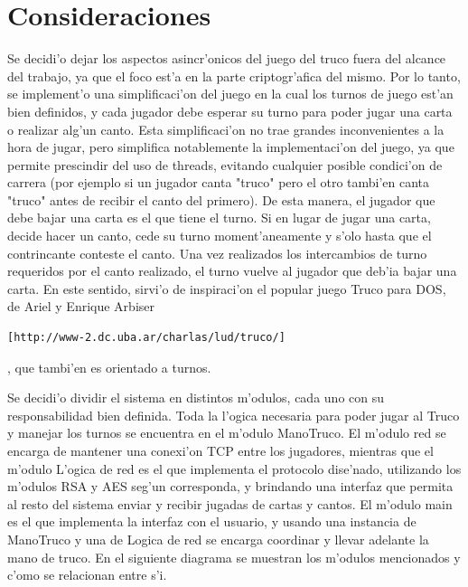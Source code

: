 \section{Consideraciones}
Se decidi'o dejar los aspectos asincr'onicos del juego del truco fuera del alcance del trabajo, ya que el foco est'a en la parte criptogr'afica del mismo.
Por lo tanto, se implement'o una simplificaci'on del juego en la cual los turnos de juego est'an bien definidos, y cada jugador debe esperar su turno para poder jugar una carta o realizar alg'un canto. Esta simplificaci'on no trae grandes inconvenientes a la hora de jugar, pero simplifica notablemente la implementaci'on del juego, ya que permite prescindir del uso de threads, evitando cualquier posible condici'on de carrera (por ejemplo si un jugador canta "truco" pero el otro tambi'en canta "truco" antes de recibir el canto del primero).
De esta manera, el jugador que debe bajar una carta es el que tiene el turno. Si en lugar de jugar una carta, decide hacer un canto, cede su turno moment'aneamente y s'olo hasta que el contrincante conteste el canto. Una vez realizados los intercambios de turno requeridos por el canto realizado, el turno vuelve al jugador que deb'ia bajar una carta.
En este sentido, sirvi'o de inspiraci'on el popular juego Truco para DOS, de Ariel y Enrique Arbiser \begin{verbatim}[http://www-2.dc.uba.ar/charlas/lud/truco/]\end{verbatim}, que tambi'en es orientado a turnos.


Se decidi'o dividir el sistema en distintos m'odulos, cada uno con su responsabilidad bien definida. Toda la l'ogica necesaria para poder jugar al Truco y manejar los turnos se encuentra en el m'odulo ManoTruco. El m'odulo red se encarga de mantener una conexi'on TCP entre los jugadores, mientras que el m'odulo L'ogica de red es el que implementa el protocolo dise'nado, utilizando los m'odulos RSA y AES seg'un corresponda, y brindando una interfaz que permita al resto del sistema enviar y recibir jugadas de cartas y cantos. El m'odulo main es el que implementa la interfaz con el usuario, y usando una instancia de ManoTruco y una de Logica de red se encarga coordinar y llevar adelante la mano de truco.
En el siguiente diagrama se muestran los m'odulos mencionados y c'omo se relacionan entre s'i.

